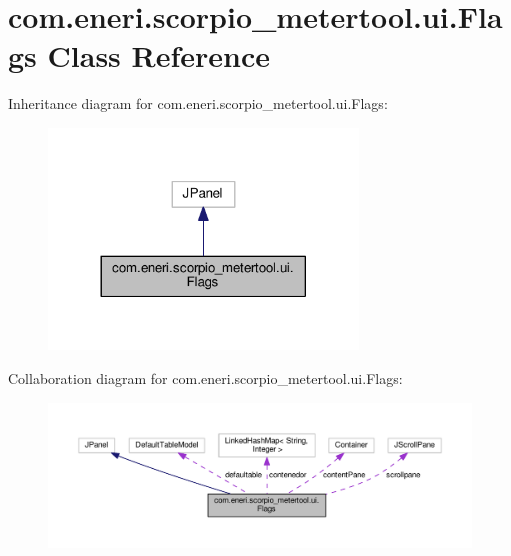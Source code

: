 \hypertarget{classcom_1_1eneri_1_1scorpio__metertool_1_1ui_1_1_flags}{}\section{com.\+eneri.\+scorpio\+\_\+metertool.\+ui.\+Flags Class Reference}
\label{classcom_1_1eneri_1_1scorpio__metertool_1_1ui_1_1_flags}


Inheritance diagram for com.\+eneri.\+scorpio\+\_\+metertool.\+ui.\+Flags\+:
\nopagebreak
\begin{figure}[H]
\begin{center}
\leavevmode
\includegraphics[width=233pt]{classcom_1_1eneri_1_1scorpio__metertool_1_1ui_1_1_flags__inherit__graph}
\end{center}
\end{figure}


Collaboration diagram for com.\+eneri.\+scorpio\+\_\+metertool.\+ui.\+Flags\+:
\nopagebreak
\begin{figure}[H]
\begin{center}
\leavevmode
\includegraphics[width=350pt]{classcom_1_1eneri_1_1scorpio__metertool_1_1ui_1_1_flags__coll__graph}
\end{center}
\end{figure}
